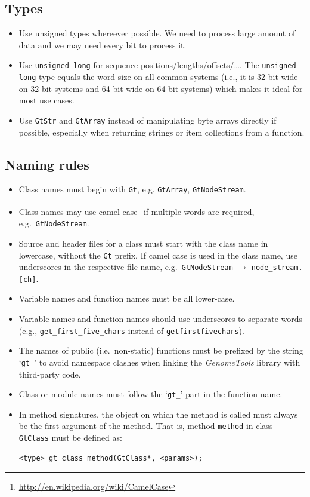 \documentclass[11pt,final]{article}
\newcommand{\keyword}[1]{\lstinline{#1}}
\newcommand{\Gt}[0]{\emph{GenomeTools}\xspace}
\begin{document}
\subsection{Types}
\begin{itemize}
\item
Use unsigned types whereever possible. We need to process large amount
of data and we may need every bit to process it.
\item
Use \keyword{unsigned long} for sequence positions/lengths/offsets/\dots .
The \keyword{unsigned long} type equals the word size on all common systems
(i.e., it is 32-bit wide on 32-bit systems and 64-bit wide on 64-bit systems)
which makes it ideal for most use cases.
\item
Use \keyword{GtStr} and \keyword{GtArray} instead of manipulating byte arrays
directly if possible, especially when returning strings or item collections
from a function.
\end{itemize}

\subsection{Naming rules}
\begin{itemize}
\item
Class names must begin with \keyword{Gt}, e.g. \keyword{GtArray},
\keyword{GtNodeStream}.
\item
Class names may use camel
case\footnote{\url{http://en.wikipedia.org/wiki/CamelCase}} if multiple words
are required, e.g.\ \keyword{GtNodeStream}.
\item
Source and header files for a class must start with the class name in
lowercase, without the \keyword{Gt} prefix. If camel case is used in the class
name, use underscores in the respective file name, e.g.\
\keyword{GtNodeStream} $\to$ \keyword{node_stream.[ch]}.
\item
Variable names and function names must be all lower-case.
\item
Variable names and function names should use underscores to separate words
(e.g., \keyword{get_first_five_chars} instead of \keyword{getfirstfivechars}).
\item
The names of public (i.e.\ non-static) functions must be prefixed by the string
`\keyword{gt_}' to avoid namespace clashes when linking the \Gt library with
third-party code.
\item
Class or module names must follow the `\keyword{gt_}' part in the function name.
\item
In method signatures, the object on which the method is called must always be
the first argument of the method.
That is, method \keyword{method} in class \keyword{GtClass} must be defined as:
\begin{lstlisting}
<type> gt_class_method(GtClass*, <params>);
\end{lstlisting}
\end{itemize}
\end{document}

